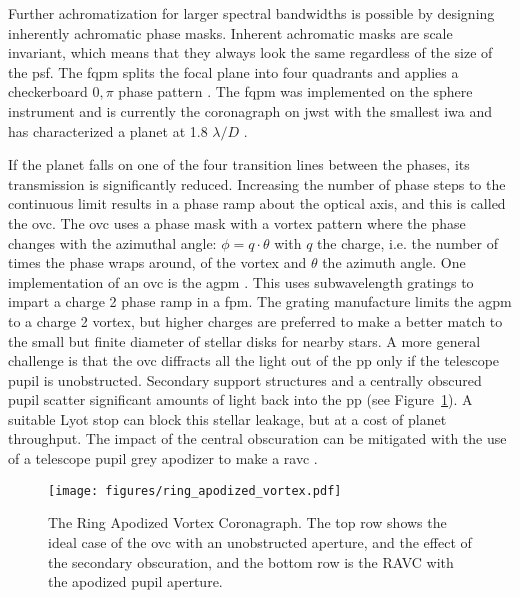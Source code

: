 \documentclass[letterpaper]{ar-1col}
\newcommand{\ld}{$\lambda/D$}
\newcommand{\acc}[1]{\entry{\acs{#1}}{\acl{#1}}}
\begin{document}
\begin{armarginnote}[]
\acc{ovc}
\acc{fqpm}
\acc{agpm}
\end{armarginnote}

Further achromatization for larger spectral bandwidths is possible by designing inherently achromatic phase masks.
%
Inherent achromatic masks are scale invariant, which means that they always look the same regardless of the size of the \ac{psf}.
%
The \ac{fqpm} splits the focal plane into four quadrants and applies a checkerboard $0,\pi$ phase pattern \citep{Riaud00}.
%
The \ac{fqpm} was implemented on the \ac{sphere} instrument \citep{Boccaletti04} and is currently the coronagraph on \ac{jwst} with the smallest \ac{iwa} and has characterized a planet at 1.8 \ld{} \citep{franson2024jwst}. 

If the planet falls on one of the four transition lines between the phases, its transmission is significantly reduced.
%
Increasing the number of phase steps to the continuous limit results in a phase ramp about the optical axis, and this is called the \ac{ovc}.
%
The \ac{ovc} uses a phase mask with a vortex pattern where the phase changes with the azimuthal angle: $\phi=q \cdot \theta$ with $q$ the charge, i.e. the number of times the phase wraps around, of the vortex and $\theta$ the azimuth angle.
%
One implementation of an \ac{ovc} is the \acl{agpm} \citep[\acs{agpm}; ][]{Mawet05b}.
%
This uses subwavelength gratings to impart a charge 2 phase ramp in a \ac{fpm}.
%
The grating manufacture limits the \ac{agpm} to a charge 2 vortex, but higher charges are preferred to make a better match to the small but finite diameter of stellar disks for nearby stars.
%
A more general challenge is that the \ac{ovc} diffracts all the light out of the \ac{pp} only if the telescope pupil is unobstructed.
%
Secondary support structures and a centrally obscured pupil scatter significant amounts of light back into the \ac{pp} (see Figure~\ref{fig:ravc}).
%
A suitable Lyot stop can block this stellar leakage, but at a cost of planet throughput.
%
The impact of the central obscuration can be mitigated with the use of a telescope pupil grey apodizer to make a \acl{ravc} \citep[\acs{ravc}; ][]{Mawet13a}.
%



\begin{figure}[ht]
  \centering
  \texttt{[image: figures/ring\_apodized\_vortex.pdf]}
  \caption{The Ring Apodized Vortex Coronagraph. The top row shows the ideal case of the \ac{ovc} with an unobstructed aperture, and the effect of the secondary obscuration, and the bottom row is the RAVC with the apodized pupil aperture.}
  \label{fig:ravc}
\end{figure}
\end{document}
